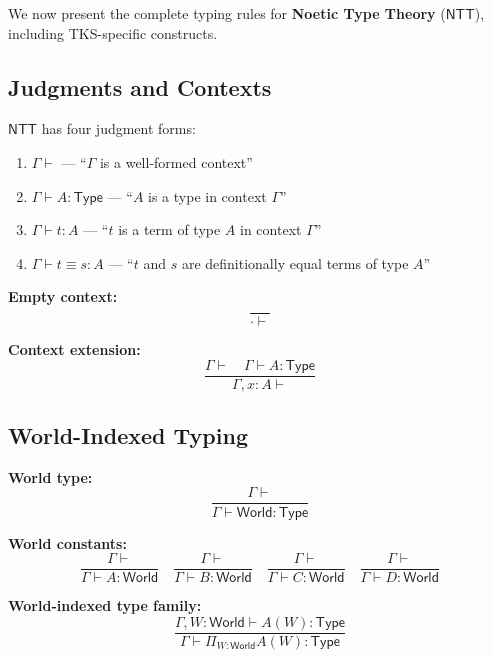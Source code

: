 We now present the complete typing rules for \textbf{Noetic Type Theory}
($\mathsf{NTT}$), including TKS-specific constructs.

\subsection{Judgments and Contexts}
\label{subsec:judgments-contexts}

\begin{definition}
\label{def:ntt-judgments}
$\mathsf{NTT}$ has four judgment forms:
\begin{enumerate}[label=(\roman*)]
  \item $\Gamma \vdash$ --- ``$\Gamma$ is a well-formed context''
  \item $\Gamma \vdash A : \mathsf{Type}$ --- ``$A$ is a type in context $\Gamma$''
  \item $\Gamma \vdash t : A$ --- ``$t$ is a term of type $A$ in context $\Gamma$''
  \item $\Gamma \vdash t \equiv s : A$ --- ``$t$ and $s$ are definitionally equal
        terms of type $A$''
\end{enumerate}
\end{definition}

\begin{definition}
\label{def:context-rules}
\textbf{Empty context:}
\[
  \frac{}{\cdot \vdash}
  \tag{Ctx-Empty}
\]

\textbf{Context extension:}
\[
  \frac{\Gamma \vdash \quad \Gamma \vdash A : \mathsf{Type}}
       {\Gamma, x : A \vdash}
  \tag{Ctx-Ext}
\]
\end{definition}

\subsection{World-Indexed Typing}
\label{subsec:world-indexed-typing}

\begin{definition}
\label{def:world-type-formation}
\textbf{World type:}
\[
  \frac{\Gamma \vdash}
       {\Gamma \vdash \mathsf{World} : \mathsf{Type}}
  \tag{World-Form}
\]

\textbf{World constants:}
\[
  \frac{\Gamma \vdash}
       {\Gamma \vdash A : \mathsf{World}}
  \quad
  \frac{\Gamma \vdash}
       {\Gamma \vdash B : \mathsf{World}}
  \quad
  \frac{\Gamma \vdash}
       {\Gamma \vdash C : \mathsf{World}}
  \quad
  \frac{\Gamma \vdash}
       {\Gamma \vdash D : \mathsf{World}}
  \tag{World-Intro}
\]

\textbf{World-indexed type family:}
\[
  \frac{\Gamma, W : \mathsf{World} \vdash A(W) : \mathsf{Type}}
       {\Gamma \vdash \Pi_{W : \mathsf{World}} A(W) : \mathsf{Type}}
  \tag{World-$\Pi$}
\]
\end{definition}

